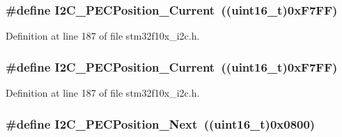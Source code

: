 \subsubsection[{\texorpdfstring{I2\+C\+\_\+\+P\+E\+C\+Position\+\_\+\+Current}{I2C_PECPosition_Current}}]{\setlength{\rightskip}{0pt plus 5cm}\#define I2\+C\+\_\+\+P\+E\+C\+Position\+\_\+\+Current~(({\bf uint16\+\_\+t})0x\+F7\+F\+F)}\hypertarget{group___i2_c___p_e_c__position_ga8a393364dd651f88bcaebac71c1c52c7}{}\label{group___i2_c___p_e_c__position_ga8a393364dd651f88bcaebac71c1c52c7}


Definition at line 187 of file stm32f10x\+\_\+i2c.\+h.

\subsubsection[{\texorpdfstring{I2\+C\+\_\+\+P\+E\+C\+Position\+\_\+\+Current}{I2C_PECPosition_Current}}]{\setlength{\rightskip}{0pt plus 5cm}\#define I2\+C\+\_\+\+P\+E\+C\+Position\+\_\+\+Current~(({\bf uint16\+\_\+t})0x\+F7\+F\+F)}\hypertarget{group___i2_c___p_e_c__position_ga8a393364dd651f88bcaebac71c1c52c7}{}\label{group___i2_c___p_e_c__position_ga8a393364dd651f88bcaebac71c1c52c7}


Definition at line 187 of file stm32f10x\+\_\+i2c.\+h.

\subsubsection[{\texorpdfstring{I2\+C\+\_\+\+P\+E\+C\+Position\+\_\+\+Next}{I2C_PECPosition_Next}}]{\setlength{\rightskip}{0pt plus 5cm}\#define I2\+C\+\_\+\+P\+E\+C\+Position\+\_\+\+Next~(({\bf uint16\+\_\+t})0x0800)}\hypertarget{group___i2_c___p_e_c__position_ga74d0996efe6e278fb28d053ba78fccc5}{}\label{group___i2_c___p_e_c__position_ga74d0996efe6e278fb28d053ba78fccc5}



